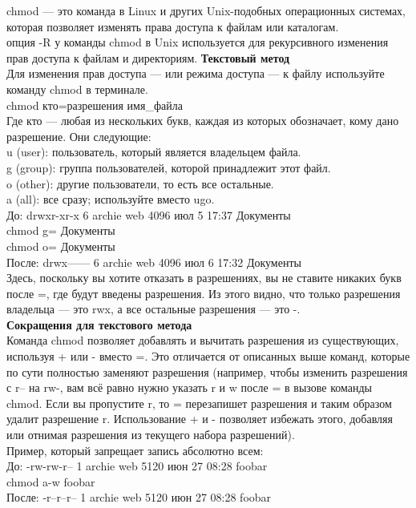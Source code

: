\noindent chmod — это команда в Linux и других Unix-подобных операционных системах, которая позволяет изменять права доступа к файлам или каталогам. \\
опция -R у команды chmod в Unix используется для рекурсивного изменения прав доступа к файлам и директориям.
\textbf{Текстовый метод} \\
Для изменения прав доступа — или режима доступа — к файлу используйте команду chmod в терминале. \\
chmod кто=разрешения имя\_файла \\
Где кто — любая из нескольких букв, каждая из которых обозначает, кому дано разрешение. Они следующие: \\
u (user): пользователь, который является владельцем файла. \\
g (group): группа пользователей, которой принадлежит этот файл. \\
o (other): другие пользователи, то есть все остальные. \\
a (all): все сразу; используйте вместо ugo. \\
До: drwxr-xr-x 6 archie web 4096 июл 5 17:37 Документы \\
chmod g= Документы \\
chmod o= Документы \\
После: drwx------ 6 archie web 4096 июл 6 17:32 Документы \\
Здесь, поскольку вы хотите отказать в разрешениях, вы не ставите никаких букв после =, где будут введены разрешения. Из этого видно, что только разрешения владельца — это rwx, а все остальные разрешения — это -. \\
\textbf{Сокращения для текстового метода} \\
Команда chmod позволяет добавлять и вычитать разрешения из существующих, используя + или - вместо =. Это отличается от описанных выше команд, которые по сути полностью заменяют разрешения (например, чтобы изменить разрешения с r-- на rw-, вам всё равно нужно указать r и w после = в вызове команды chmod. Если вы пропустите r, то = перезапишет разрешения и таким образом удалит разрешение r. Использование + и - позволяет избежать этого, добавляя или отнимая разрешения из текущего набора разрешений). \\
Пример, который запрещает запись абсолютно всем: \\
До: -rw-rw-r-- 1 archie web 5120 июн 27 08:28 foobar \\
chmod a-w foobar \\
После: -r--r--r-- 1 archie web 5120 июн 27 08:28 foobar \\

